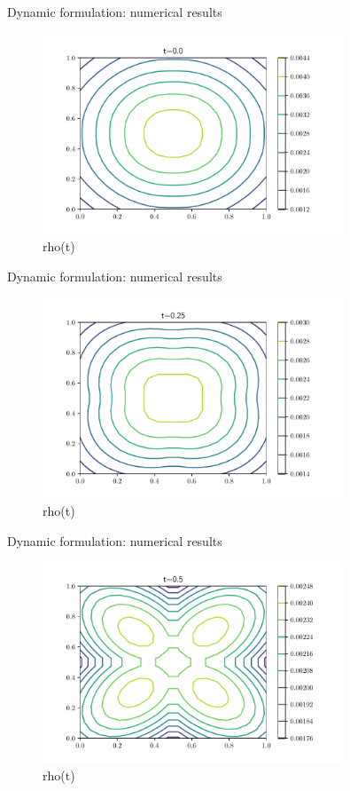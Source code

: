 \documentclass{beamer}
\begin{document}
\begin{frame}{Dynamic formulation: numerical results}
\begin{figure}
    \centering
    \includegraphics[width=0.8\textwidth]{graphics/rho(0).pdf}
    \caption{rho(t)}
    \label{fig:nu}
\end{figure}
\end{frame}
\begin{frame}{Dynamic formulation: numerical results}
\begin{figure}
    \centering
    \includegraphics[width=0.8\textwidth]{graphics/rho(1).pdf}
    \caption{rho(t)}
    \label{fig:nu}
\end{figure}
\end{frame}
\begin{frame}{Dynamic formulation: numerical results}
\begin{figure}
    \centering
    \includegraphics[width=0.8\textwidth]{graphics/rho(2).pdf}
    \caption{rho(t)}
    \label{fig:nu}
\end{figure}
\end{frame}
\end{document}
